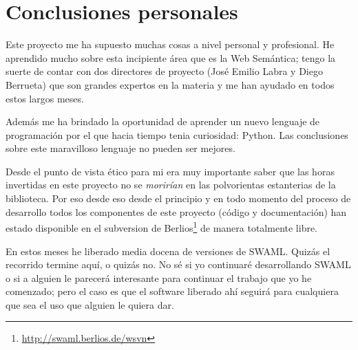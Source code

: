 
\section{Conclusiones personales}

Este proyecto me ha supuesto muchas cosas a nivel personal y profesional. He
aprendido mucho sobre esta incipiente área que es la Web Semántica; tengo la
suerte de contar con dos directores de proyecto (José Emilio Labra y Diego
Berrueta) que son grandes expertos en la materia y me han ayudado en todos 
estos largos meses.

Además me ha brindado la oportunidad de aprender un nuevo lenguaje de programación 
por el que hacia tiempo tenia curiosidad: Python. Las conclusiones sobre este 
maravilloso lenguaje no pueden ser mejores.

Desde el punto de vista ético para mi era muy importante saber que las horas
invertidas en este proyecto no se \emph{morirían} en las polvorientas estanterias
de la biblioteca. Por eso desde eso desde el principio y en todo momento del
proceso de desarrollo todos los componentes de este proyecto (código y 
documentación) han estado disponible en el subversion de 
Berlios\footnote{\url{http://swaml.berlios.de/wsvn}} de manera totalmente
libre.

En estos meses he liberado media docena de versiones de SWAML. Quizás el recorrido
termine aquí, o quizás no. No sé si yo continuaré desarrollando SWAML o si a alguien
le parecerá interesante para continuar el trabajo que yo he comenzado; pero el caso
es que el software liberado ahí seguirá para cualquiera que sea el uso que alguien
le quiera dar.
